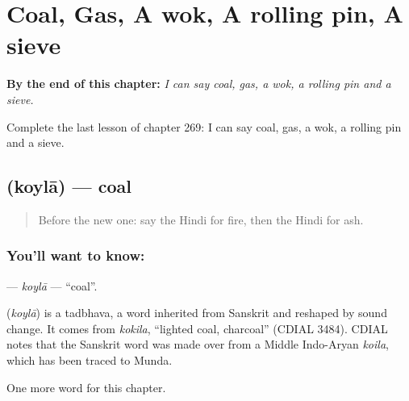 
\chapter{Coal, Gas, A wok, A rolling pin, A sieve}
\label{ch:hi-coal-gas-a-wok-a-rolling-pin-a-sieve}

\begin{chapteropening}
\textbf{By the end of this chapter:} \emph{I can say coal, gas, a wok, a rolling pin and a sieve.}

Complete the last lesson of chapter 269: I can say coal, gas, a wok, a rolling pin and a sieve.
\end{chapteropening}

\section[\texorpdfstring{\hi{कोयला} (koylā)}{कोयला (koylā)}]{ (koylā) — coal}

\label{lesson:HI-C269-koyla}



\begin{quote}
Before the new one: say the Hindi for fire, then the Hindi for ash.
\end{quote}

\subsection*{You'll want to know: }
\textbf{} — \emph{koylā} — \textquotedblleft{}coal\textquotedblright{}.

\begin{cousinweb}
\textbf{} (\emph{koylā}) is a tadbhava, a word inherited from Sanskrit and reshaped by sound change. It comes from \emph{kokila}, \textquotedblleft{}lighted coal, charcoal\textquotedblright{} (CDIAL 3484). CDIAL notes that the Sanskrit word was made over from a Middle Indo-Aryan \emph{koila}, which has been traced to Munda.
\end{cousinweb}

\begin{grammarlens}[title={What you've built}]
One more word for this chapter.
\end{grammarlens}


